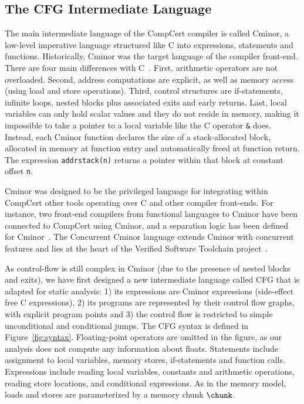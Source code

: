 \subsection{The CFG Intermediate Language}

The main intermediate language of the CompCert compiler is called
Cminor, a low-level imperative language structured like C into
expressions, statements and functions. Historically, Cminor was the target
language of the compiler front-end. There are four main differences
with C~\cite{Leroy-backend}. First, arithmetic operators are not
overloaded. Second, address computations are explicit, as well as memory access
(using load and store operations). Third, control
structures are if-statements, infinite loops, nested blocks
plus associated exits and early returns. Last, local variables can only
hold scalar values and they do not reside in memory, making it
impossible to take a pointer to a local variable like the C operator
{\tt \&} does. Instead, each Cminor function declares the size of a
stack-allocated block, allocated in memory at function entry and
automatically freed at function return. 
The expression \lstinline!addrstack(n)! returns a pointer within that
block at constant offset \lstinline!n!.


Cminor was designed to be the privileged language for integrating within
CompCert other tools operating over C and other compiler front-ends. For
instance, two front-end compilers from functional languages to Cminor
have been connected to CompCert using Cminor, and a separation logic
has been defined for Cminor~\cite{Appel-Blazy-07}. 
The Concurrent Cminor language extends Cminor with concurrent features
and lies at the heart of the Verified Software Toolchain project~\cite{VST}.

As control-flow is still complex in Cminor (due to the presence of
nested blocks and exits), we have first designed a new
intermediate language called CFG that is adapted for static analysis:
1) its expressions are Cminor expressions (\ie side-effect free
C expressions), 2) its programs are represented by their control flow graphs, with
explicit program points and 3) the control flow is restricted to
simple unconditional and conditional jumps.
The CFG syntax is defined in Figure~\ref{fig:syntax}. Floating-point operators
are omitted in the figure, as our analysis does not compute any information about floats.
Statements include assignment to local variables, memory stores,
if-statements and function calls. 
Expressions include reading local variables, constants and arithmetic
operations, reading store locations, and conditional expressions. 
As in the memory model, loads and stores are parameterized by a memory
chunk $\chunk$.

